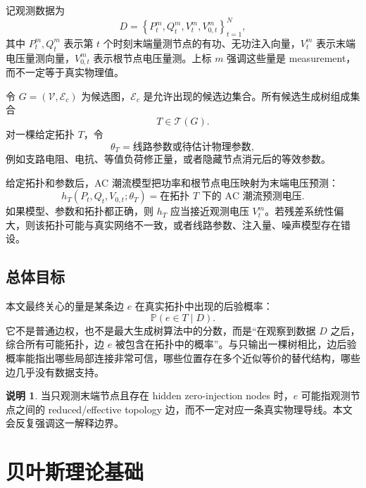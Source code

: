 \documentclass[UTF8,12pt,openany]{ctexrep}
\numberwithin{equation}{chapter}
\theoremstyle{definition}
\newtheorem{remark}{说明}[chapter]
\theoremstyle{plain}
\newcommand{\Prob}{\mathbb{P}}
\newcommand{\Tcal}{\mathcal{T}}
\begin{document}
记观测数据为
\begin{equation}
D=\left\{P_t^m,Q_t^m,V_t^m,V_{0,t}^m\right\}_{t=1}^N ,
\end{equation}
其中 $P_t^m,Q_t^m$ 表示第 $t$ 个时刻末端量测节点的有功、无功注入向量，$V_t^m$ 表示末端电压量测向量，$V_{0,t}^m$ 表示根节点电压量测。上标 $m$ 强调这些量是 measurement，而不一定等于真实物理值。

令 $G=(\mathcal{V},\mathcal{E}_c)$ 为候选图，$\mathcal{E}_c$ 是允许出现的候选边集合。所有候选生成树组成集合
\begin{equation}
T\in \Tcal(G).
\end{equation}
对一棵给定拓扑 $T$，令
\begin{equation}
\theta_T=\text{线路参数或待估计物理参数},
\end{equation}
例如支路电阻、电抗、等值负荷修正量，或者隐藏节点消元后的等效参数。

给定拓扑和参数后，AC 潮流模型把功率和根节点电压映射为末端电压预测：
\begin{equation}
h_T(P_t,Q_t,V_{0,t};\theta_T)
=\text{在拓扑 }T\text{ 下的 AC 潮流预测电压}.
\end{equation}
如果模型、参数和拓扑都正确，则 $h_T$ 应当接近观测电压 $V_t^m$。若残差系统性偏大，则该拓扑可能与真实网络不一致，或者线路参数、注入量、噪声模型存在错设。

\section{总体目标}

本文最终关心的量是某条边 $e$ 在真实拓扑中出现的后验概率：
\begin{equation}
\Prob(e\in T\mid D).
\end{equation}
它不是普通边权，也不是最大生成树算法中的分数，而是“在观察到数据 $D$ 之后，综合所有可能拓扑，边 $e$ 被包含在拓扑中的概率”。与只输出一棵树相比，边后验概率能指出哪些局部连接非常可信，哪些位置存在多个近似等价的替代结构，哪些边几乎没有数据支持。

\begin{remark}
当只观测末端节点且存在 hidden zero-injection nodes 时，$e$ 可能指观测节点之间的 reduced/effective topology 边，而不一定对应一条真实物理导线。本文会反复强调这一解释边界。
\end{remark}

\chapter{贝叶斯理论基础}
\end{document}
